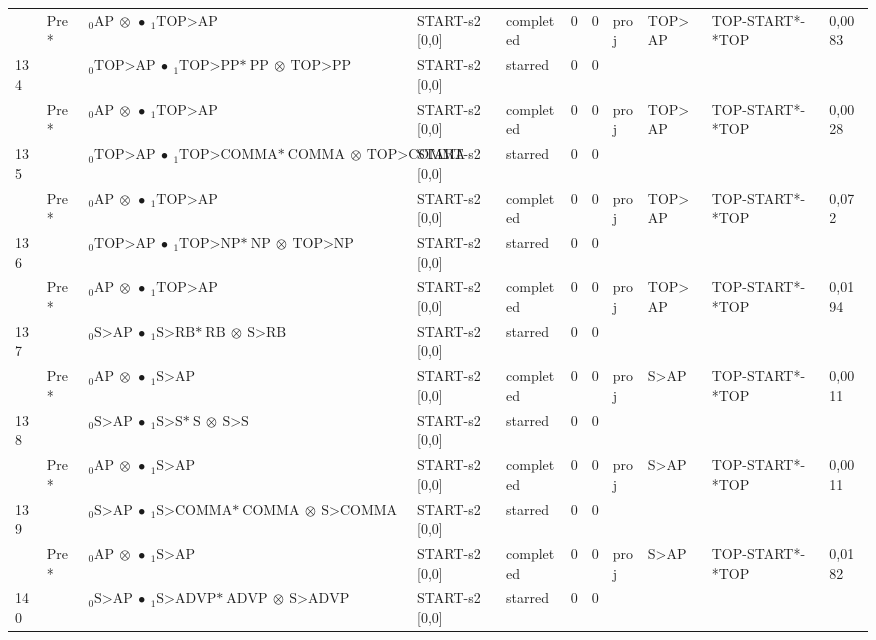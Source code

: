 \documentclass[10pt]{article}
\begin{document}
\begin{longtable}[htbp]{lllllllllll}
 & Pre *& $ {}_0 \textrm{AP} \  \otimes \  \bullet \ {}_{1} \textrm{TOP>AP} $ & START-s2 [0,0] & completed & 0 & 0 & proj & TOP>AP & TOP-START*-*TOP & 0,0083 \\ 
134 & & $ {}_0 \textrm{TOP>AP} \  \bullet \ {}_{1} \textrm{TOP>PP*} \ \textrm{PP} \  \otimes \ \textrm{TOP>PP} $ & START-s2 [0,0] & starred & 0 & 0 & & & & \\ 
 & Pre *& $ {}_0 \textrm{AP} \  \otimes \  \bullet \ {}_{1} \textrm{TOP>AP} $ & START-s2 [0,0] & completed & 0 & 0 & proj & TOP>AP & TOP-START*-*TOP & 0,0028 \\ 
135 & & $ {}_0 \textrm{TOP>AP} \  \bullet \ {}_{1} \textrm{TOP>COMMA*} \ \textrm{COMMA} \  \otimes \ \textrm{TOP>COMMA} $ & START-s2 [0,0] & starred & 0 & 0 & & & & \\ 
 & Pre *& $ {}_0 \textrm{AP} \  \otimes \  \bullet \ {}_{1} \textrm{TOP>AP} $ & START-s2 [0,0] & completed & 0 & 0 & proj & TOP>AP & TOP-START*-*TOP & 0,072 \\ 
136 & & $ {}_0 \textrm{TOP>AP} \  \bullet \ {}_{1} \textrm{TOP>NP*} \ \textrm{NP} \  \otimes \ \textrm{TOP>NP} $ & START-s2 [0,0] & starred & 0 & 0 & & & & \\ 
 & Pre *& $ {}_0 \textrm{AP} \  \otimes \  \bullet \ {}_{1} \textrm{TOP>AP} $ & START-s2 [0,0] & completed & 0 & 0 & proj & TOP>AP & TOP-START*-*TOP & 0,0194 \\ 
137 & & $ {}_0 \textrm{S>AP} \  \bullet \ {}_{1} \textrm{S>RB*} \ \textrm{RB} \  \otimes \ \textrm{S>RB} $ & START-s2 [0,0] & starred & 0 & 0 & & & & \\ 
 & Pre *& $ {}_0 \textrm{AP} \  \otimes \  \bullet \ {}_{1} \textrm{S>AP} $ & START-s2 [0,0] & completed & 0 & 0 & proj & S>AP & TOP-START*-*TOP & 0,0011 \\ 
138 & & $ {}_0 \textrm{S>AP} \  \bullet \ {}_{1} \textrm{S>S*} \ \textrm{S} \  \otimes \ \textrm{S>S} $ & START-s2 [0,0] & starred & 0 & 0 & & & & \\ 
 & Pre *& $ {}_0 \textrm{AP} \  \otimes \  \bullet \ {}_{1} \textrm{S>AP} $ & START-s2 [0,0] & completed & 0 & 0 & proj & S>AP & TOP-START*-*TOP & 0,0011 \\ 
139 & & $ {}_0 \textrm{S>AP} \  \bullet \ {}_{1} \textrm{S>COMMA*} \ \textrm{COMMA} \  \otimes \ \textrm{S>COMMA} $ & START-s2 [0,0] & starred & 0 & 0 & & & & \\ 
 & Pre *& $ {}_0 \textrm{AP} \  \otimes \  \bullet \ {}_{1} \textrm{S>AP} $ & START-s2 [0,0] & completed & 0 & 0 & proj & S>AP & TOP-START*-*TOP & 0,0182 \\ 
140 & & $ {}_0 \textrm{S>AP} \  \bullet \ {}_{1} \textrm{S>ADVP*} \ \textrm{ADVP} \  \otimes \ \textrm{S>ADVP} $ & START-s2 [0,0] & starred & 0 & 0 & & & & \\ 

\end{longtable}
\end{document}
